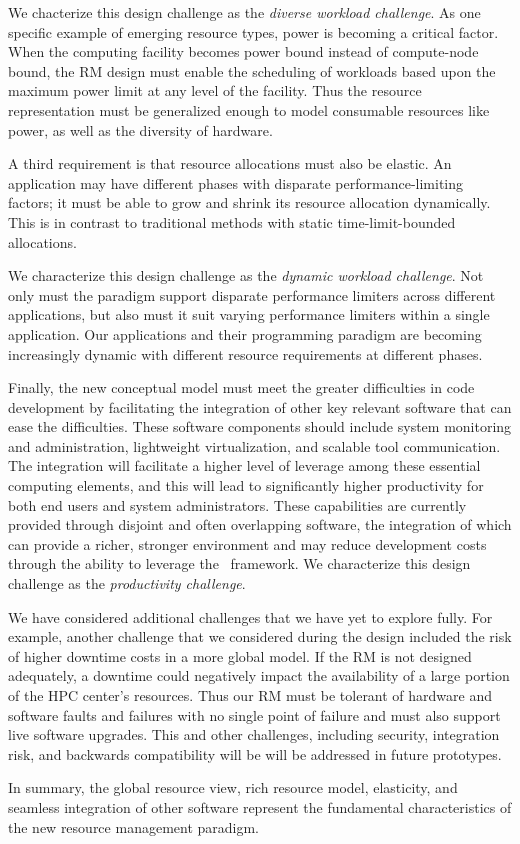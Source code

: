 We chacterize this design challenge as the {\em diverse workload
challenge}.   As one specific example of emerging resource types,
power is becoming a critical factor. When the computing facility
becomes power bound instead of compute-node bound, the RM design
must enable the scheduling of workloads based upon the maximum
power limit at any level of the facility. Thus the resource
representation must be generalized enough to model consumable
resources like power, as well as the diversity of hardware.

A third requirement is that resource allocations
must also be elastic. An application may have different
phases with disparate performance-limiting factors;
it must be able to grow and shrink its resource allocation
dynamically.  This is in contrast to traditional methods with
static time-limit-bounded allocations.

We characterize this design challenge as the {\em dynamic workload
challenge}.  
Not only must the paradigm support disparate performance limiters
across different applications, but also must it suit varying
performance limiters within a single application. Our applications
and their programming paradigm are becoming increasingly dynamic with
different resource requirements at different phases.

Finally, the new conceptual model must meet the greater difficulties
in code development by facilitating the integration 
of other key relevant software that can ease the difficulties. 
These software components should include system monitoring
and administration, lightweight virtualization,
and scalable tool communication.
The integration will facilitate a higher level of
leverage among these essential computing elements,
and this will lead to significantly higher productivity
for both end users and system administrators.
These capabilities are currently provided
through disjoint and often overlapping software,
the integration of which can provide a richer, stronger environment
and may reduce development costs through the ability to leverage
the \flux\ framework.
We characterize this design challenge as the {\em productivity challenge}.

We have considered additional challenges that we
have yet to explore fully. For example,
another challenge that we considered during the design included
the risk of higher downtime costs in a more global model.
If the RM is not designed adequately, a downtime could negatively
impact the availability of a large portion of the HPC center’s
resources. Thus our RM must be tolerant of hardware and software
faults and failures with no single point of failure and must
also support live software upgrades. This and other challenges,
including security, integration risk, and backwards compatibility will be 
will be addressed in future prototypes.

In summary, the global resource view, rich resource model,
elasticity, and seamless integration of other software 
represent the fundamental characteristics of the new
 resource management paradigm.  

